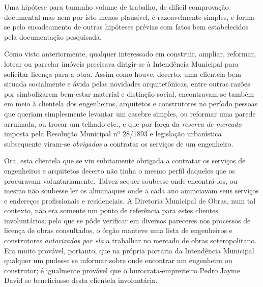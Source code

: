Uma hipótese para tamanho volume de trabalho, de difícil comprovação documental mas nem por isto menos plausível, é razoavelmente simples, e forma-se pelo encadeamento de outras hipóteses prévias com fatos bem estabelecidos pela documentação pesquisada. 

Como visto anteriormente, qualquer interessado em construir, ampliar, reformar, lotear ou parcelar imóveis precisava dirigir-se à Intendência Municipal para solicitar licença para a obra. Assim como houve, decerto, uma clientela bem situada socialmente e ávida pelas novidades arquitetônicas, entre outras razões por simbolizarem bem-estar material e distinção social, encontravam-se também em meio à clientela dos engenheiros, arquitetos e construtores no período pessoas que queriam simplesmente levantar um casebre simples, ou reformar uma parede arruinada, ou trocar um telhado etc., e que por força da \textit{reserva de mercado} imposta pela Resolução Municipal nº 28/1893 e legislação urbanística subsequente viram-se \textit{obrigados} a contratar os serviços de um engenheiro.

Ora, esta clientela que se viu subitamente obrigada a contratar os serviços de engenheiros e arquitetos decerto não tinha o mesmo perfil daqueles que os procuravam voluntariamente. Talvez sequer soubesse onde encontrá-los, ou mesmo não soubesse ler os almanaques onde a cada ano anunciavam seus serviços e endereços profissionais e residenciais. A Diretoria Municipal de Obras, num tal contexto, não era somente um ponto de referência para estes clientes involuntários; pelo que se pôde verificar em diversos pareceres nos processos de licença de obras consultados, o órgão manteve uma lista de engenheiros e construtores \textit{autorizados por ela} a trabalhar no mercado de obras soteropolitano. Era muito provável, portanto, que na própria portaria da Intendência Municipal qualquer um pudesse se informar sobre onde encontrar um engenheiro ou construtor; é igualmente provável que o burocrata-empreiteiro Pedro Jayme David se beneficiasse desta clientela involuntária.

